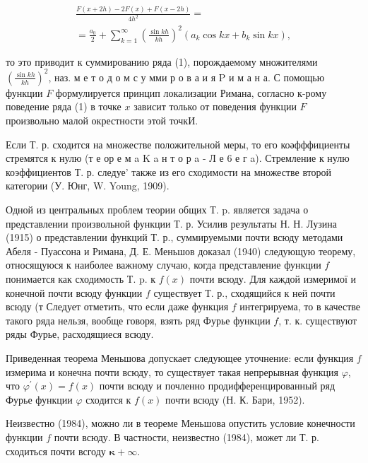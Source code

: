 \documentclass[10pt]{article}
\begin{document}
\[

\begin{gathered}

\frac{F(x+2 h)-2 F(x)+F(x-2 h)}{4 h^{2}}= \\

=\frac{a_{0}}{2}+\sum_{k=1}^{\infty}\left(\frac{\sin k h}{k h}\right)^{2}\left(a_{k} \cos k x+b_{k} \sin k x\right),

\end{gathered}

\]



то это приводит к суммированию ряда (1), порождаемому множителями $\left(\frac{\sin k h}{k h}\right)^{2}$, наз. м е т о д о м с у мми р о в а и я $\mathrm{P}$ и м а н а. С помощью функции $F$ формулируется принцип локализации Римана, согласно к-рому поведение ряда (1) в точке $x$ зависит только от поведения функции $F$ произвольно малой окрестности этой точкИ.



Если Т. р. сходится на множестве положительной меры, то его коәфффициенты стремятся к нулю (т е ор е м a K a н т о р a - Л е 6 е г a). Стремление к нулю коэффициентов Т. р. следуе' также из его сходимости на множестве второй категории (У. Юнг, W. Young, 1909).



Одной из центральных проблем теории общих Т. p. является задача о представлении произвольной функции Т. р. Усилив результаты Н. Н. Лузина (1915) о представлении функций Т. р., суммируемыми почти всюду методами Абеля - Пуассона и Римана, Д. Е. Меньшов доказал (1940) следующую теорему, относящуюся к наиболее важному случаю, когда представление функции $f$ понимается как сходимость Т. p. к $f(x)$ почти всюду. Для каждой измеримої и конечной почти всюду функции $f$ существует Т. р., сходящийся к ней почти всюду (т Следует отметить, что если даже функция $f$ интегрируема, то в качестве такого ряда нельзя, вообще говоря, взять ряд Фурье функции $f$, т. к. существуют ряды Фурье, расходящиеся всюду.



Приведенная теорема Меньшова допускает следующее уточнение: если функция $f$ измерима и конечна почти всюду, то существует такая непрерывная функция $\varphi$, что $\varphi^{\prime}(x)=f(x)$ почти всюду и почленно продифференцированный ряд Фурье функции $\varphi$ сходится к $f(x)$ почти всюду (Н. К. Бари, 1952).



Неизвестно (1984), можно ли в теореме Меньшова опустить условие конечности функции $f$ почти всюду. В частности, неизвестно (1984), может ли Т. р. сходиться почти всгоду $\boldsymbol{\kappa}+\infty$.
\end{document}
